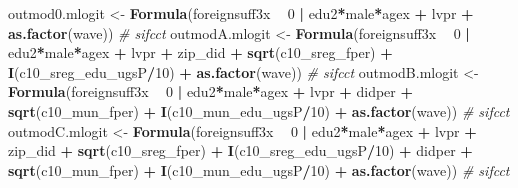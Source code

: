 \documentclass[
]{article}
\newenvironment{Shaded}{\begin{snugshade}}{\end{snugshade}}
\newcommand{\CommentTok}[1]{\textcolor[rgb]{0.56,0.35,0.01}{\textit{#1}}}
\newcommand{\DecValTok}[1]{\textcolor[rgb]{0.00,0.00,0.81}{#1}}
\newcommand{\KeywordTok}[1]{\textcolor[rgb]{0.13,0.29,0.53}{\textbf{#1}}}
\newcommand{\NormalTok}[1]{#1}
\newcommand{\OperatorTok}[1]{\textcolor[rgb]{0.81,0.36,0.00}{\textbf{#1}}}
\newcommand{\StringTok}[1]{\textcolor[rgb]{0.31,0.60,0.02}{#1}}
\begin{document}
\begin{Shaded}
\begin{Highlighting}[]
\NormalTok{outmod0.mlogit <-}\StringTok{ }\KeywordTok{Formula}\NormalTok{(foreignsuff3x  }\OperatorTok{~}\StringTok{ }\DecValTok{0} \OperatorTok{|}\StringTok{ }\NormalTok{edu2}\OperatorTok{*}\NormalTok{male}\OperatorTok{*}\NormalTok{agex }\OperatorTok{+}\StringTok{ }\NormalTok{lvpr }\OperatorTok{+}\StringTok{  }
\StringTok{                            }\KeywordTok{as.factor}\NormalTok{(wave)) }\CommentTok{# sifcct}
\NormalTok{outmodA.mlogit <-}\StringTok{ }\KeywordTok{Formula}\NormalTok{(foreignsuff3x  }\OperatorTok{~}\StringTok{ }\DecValTok{0} \OperatorTok{|}\StringTok{ }\NormalTok{edu2}\OperatorTok{*}\NormalTok{male}\OperatorTok{*}\NormalTok{agex }\OperatorTok{+}\StringTok{ }\NormalTok{lvpr }\OperatorTok{+}\StringTok{  }
\StringTok{                            }\NormalTok{zip_did }\OperatorTok{+}\StringTok{ }\KeywordTok{sqrt}\NormalTok{(c10_sreg_fper) }\OperatorTok{+}\StringTok{ }\KeywordTok{I}\NormalTok{(c10_sreg_edu_ugsP}\OperatorTok{/}\DecValTok{10}\NormalTok{) }\OperatorTok{+}\StringTok{ }
\StringTok{                            }\KeywordTok{as.factor}\NormalTok{(wave)) }\CommentTok{# sifcct}
\NormalTok{outmodB.mlogit <-}\StringTok{ }\KeywordTok{Formula}\NormalTok{(foreignsuff3x  }\OperatorTok{~}\StringTok{ }\DecValTok{0} \OperatorTok{|}\StringTok{ }\NormalTok{edu2}\OperatorTok{*}\NormalTok{male}\OperatorTok{*}\NormalTok{agex }\OperatorTok{+}\StringTok{ }\NormalTok{lvpr }\OperatorTok{+}\StringTok{  }
\StringTok{                            }\NormalTok{didper }\OperatorTok{+}\StringTok{ }\KeywordTok{sqrt}\NormalTok{(c10_mun_fper) }\OperatorTok{+}\StringTok{ }\KeywordTok{I}\NormalTok{(c10_mun_edu_ugsP}\OperatorTok{/}\DecValTok{10}\NormalTok{) }\OperatorTok{+}\StringTok{ }
\StringTok{                            }\KeywordTok{as.factor}\NormalTok{(wave)) }\CommentTok{# sifcct}
\NormalTok{outmodC.mlogit <-}\StringTok{ }\KeywordTok{Formula}\NormalTok{(foreignsuff3x  }\OperatorTok{~}\StringTok{ }\DecValTok{0} \OperatorTok{|}\StringTok{ }\NormalTok{edu2}\OperatorTok{*}\NormalTok{male}\OperatorTok{*}\NormalTok{agex }\OperatorTok{+}\StringTok{ }\NormalTok{lvpr }\OperatorTok{+}\StringTok{  }
\StringTok{                            }\NormalTok{zip_did }\OperatorTok{+}\StringTok{ }\KeywordTok{sqrt}\NormalTok{(c10_sreg_fper) }\OperatorTok{+}\StringTok{ }\KeywordTok{I}\NormalTok{(c10_sreg_edu_ugsP}\OperatorTok{/}\DecValTok{10}\NormalTok{) }\OperatorTok{+}\StringTok{ }
\StringTok{                            }\NormalTok{didper }\OperatorTok{+}\StringTok{ }\KeywordTok{sqrt}\NormalTok{(c10_mun_fper) }\OperatorTok{+}\StringTok{ }\KeywordTok{I}\NormalTok{(c10_mun_edu_ugsP}\OperatorTok{/}\DecValTok{10}\NormalTok{) }\OperatorTok{+}\StringTok{ }
\StringTok{                            }\KeywordTok{as.factor}\NormalTok{(wave)) }\CommentTok{# sifcct}


\end{Highlighting}
\end{Shaded}
\end{document}
